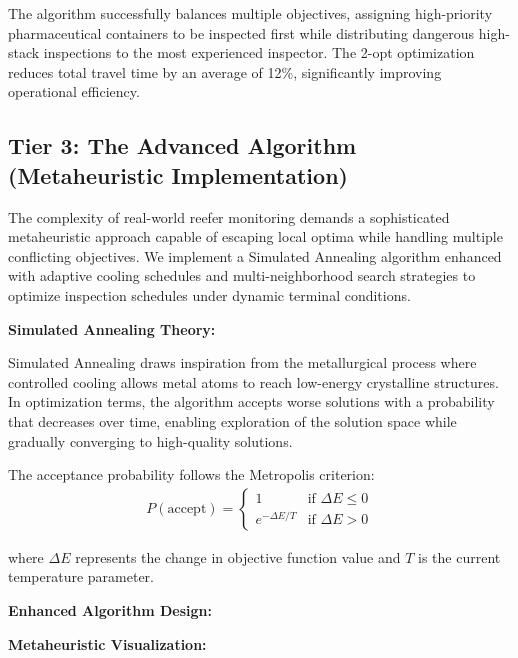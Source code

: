 \documentclass{article}
\begin{document}


The algorithm successfully balances multiple objectives, assigning high-priority pharmaceutical containers to be inspected first while distributing dangerous high-stack inspections to the most experienced inspector. The 2-opt optimization reduces total travel time by an average of 12\%, significantly improving operational efficiency.

\subsection{Tier 3: The Advanced Algorithm (Metaheuristic Implementation)}

The complexity of real-world reefer monitoring demands a sophisticated metaheuristic approach capable of escaping local optima while handling multiple conflicting objectives. We implement a Simulated Annealing algorithm enhanced with adaptive cooling schedules and multi-neighborhood search strategies to optimize inspection schedules under dynamic terminal conditions.

\textbf{Simulated Annealing Theory:}

Simulated Annealing draws inspiration from the metallurgical process where controlled cooling allows metal atoms to reach low-energy crystalline structures. In optimization terms, the algorithm accepts worse solutions with a probability that decreases over time, enabling exploration of the solution space while gradually converging to high-quality solutions.

The acceptance probability follows the Metropolis criterion:
\begin{align}
P(\text{accept}) = \begin{cases}
1 & \text{if } \Delta E \leq 0 \\
e^{-\Delta E / T} & \text{if } \Delta E > 0
\end{cases}
\end{align}

where $\Delta E$ represents the change in objective function value and $T$ is the current temperature parameter.

\textbf{Enhanced Algorithm Design:}



\textbf{Metaheuristic Visualization:}
\end{document}
